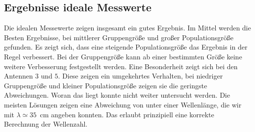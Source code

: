 \subsection{Ergebnisse ideale Messwerte}
%
Die idealen Messewerte zeigen insgesamt ein gutes Ergebnis. Im Mittel werden die Besten Ergebnisse, bei mittlerer Gruppengröße und großer Populationsgröße gefunden. Es zeigt sich, dass eine steigende Populationsgröße das Ergebnis in der Regel verbessert. Bei der Gruppengröße kann ab einer bestimmten Größe keine weitere Verbesserung festgestellt werden. Eine Besonderheit zeigt sich bei den Antennen $3$ und $5$. Diese zeigen ein umgekehrtes Verhalten, bei niedriger Gruppengröße und kleiner Populationsgröße zeigen sie die geringste Abweichungen. Woran das liegt konnte nicht weiter untersucht werden. Die meisten Lösungen zeigen eine Abweichung von unter einer Wellenlänge, die wir mit $\lambda\simeq35$~cm angeben konnten. Das erlaubt prinzipiell eine korrekte Berechnung der Wellenzahl.
%
%
